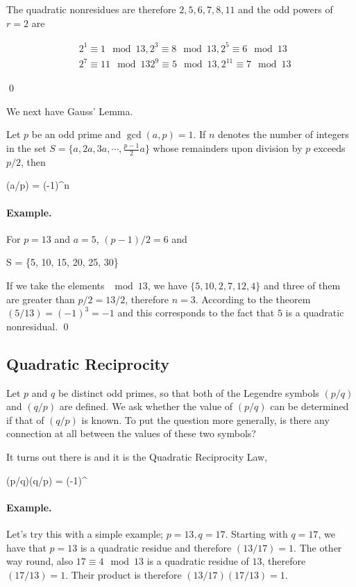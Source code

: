 The quadratic nonresidues are therefore $2, 5, 6, 7, 8, 11$ and the odd powers of $r=2$ are

\begin{align*}
& 2^1 \equiv 1 \mod 13, 2^3 \equiv 8 \mod 13, 2^5 \equiv 6 \mod 13 \\
& 2^7 \equiv 11 \mod 13 2^9 \equiv 5 \mod 13, 2^{11} \equiv 7 \mod 13
\end{align*}

\qed

We next have Gauss' Lemma.

\begin{theorem}
Let $p$ be an odd prime and $\gcd(a,p)=1$. If $n$ denotes the number of integers in the set $S = \{a, 2a, 3a, \cdots, \frac{p-1}{2}a \}$ whose remainders upon division by $p$ exceeds $p/2$, then

\bee
(a/p) = (-1)^n
\eee

\end{theorem}

\paragraph{Example.} For $p=13$ and $a=5$, $(p-1)/2 = 6$ and

\bee
S = \{5, 10, 15, 20, 25, 30\}
\eee

If we take the elements $\mod 13$, we have $\{5, 10, 2, 7, 12, 4\}$ and three of them are greater than $p/2 = 13/2$, therefore $n=3$. According to the theorem $(5/13) = (-1)^3 = -1$ and this corresponds to the fact that $5$ is a quadratic nonresidual. \qed

\subsection{Quadratic Reciprocity}

Let $p$ and $q$ be distinct odd primes, so that both of the Legendre symbols $(p/q)$ and $(q/p)$ are defined. We ask whether the value of $(p/q)$ can be determined if that of $(q/p)$ is known. To put the question more generally, is there any connection at all between the values of these two symbols?

It turns out there is and it is the Quadratic Reciprocity Law,

\bee
(p/q)(q/p) = (-1)^{  }
\eee

\paragraph{Example.} Let's try this with a simple example; $p=13, q=17$. Starting with $q=17$, we have that $p=13$ is a quadratic residue and therefore $(13/17) = 1$. The other way round, also $17 \equiv 4 \mod 13$ is a quadratic residue of $13$, therefore $(17/13) = 1$. Their product is therefore $(13/17) (17/13) = 1$.


